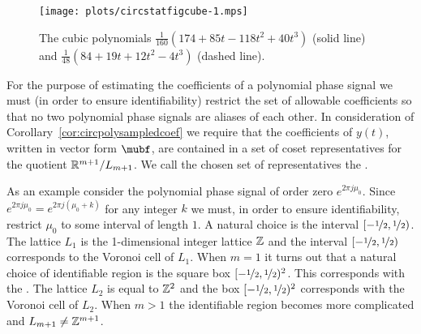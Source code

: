 \documentclass[journal]{IEEEtran}
\begin{document}

\begin{figure}[t]
	\centering
		\texttt{[image: plots/circstatfigcube-1.mps]}
		\caption{The cubic polynomials $\tfrac{1}{160} (174 + 85 t - 118 t^2 + 40 t^3)$ (solid line) and $\tfrac{1}{48} (84 + 19 t + 12 t^2 - 4 t^3)$  (dashed line).}
		\label{fig:circstatplot_cube}
\end{figure}

For the purpose of estimating the coefficients of a polynomial phase signal we must (in order to ensure identifiability) restrict the set of allowable coefficients so that no two polynomial phase signals are aliases of each other. In consideration of Corollary~\ref{cor:circpolysampledcoef} we require that the coefficients of $y(t)$, written in vector form $\mubf$, are contained in a set of coset representatives for the quotient ${\mathbb R}^{m+1}/L_{m+1}$.  We call the chosen set of representatives the .

As an example consider the polynomial phase signal of order zero $e^{2\pi j \mu_0}$.  Since $e^{2\pi j \mu_0} = e^{2\pi j(\mu_0 + k)}$ for any integer $k$ we must, in order to ensure identifiability, restrict $\mu_0$ to some interval of length $1$.  A natural choice is the interval $[-\nicefrac{1}{2}, \nicefrac{1}{2})$. The lattice $L_1$ is the 1-dimensional integer lattice ${\mathbb Z}$ and the interval $[-\nicefrac{1}{2}, \nicefrac{1}{2})$ corresponds to the Voronoi cell of $L_1$. 
When $m=1$ it turns out that a natural choice of identifiable region is the square box $[-\nicefrac{1}{2}, \nicefrac{1}{2})^2$. This corresponds with the .  The lattice $L_2$ is equal to ${\mathbb Z}^2$ and the box $[-\nicefrac{1}{2}, \nicefrac{1}{2})^2$ corresponds with the Voronoi cell of $L_2$.  
When $m > 1$ the identifiable region becomes more complicated and $L_{m+1} \neq {\mathbb Z}^{m+1}$. %
\end{document}
